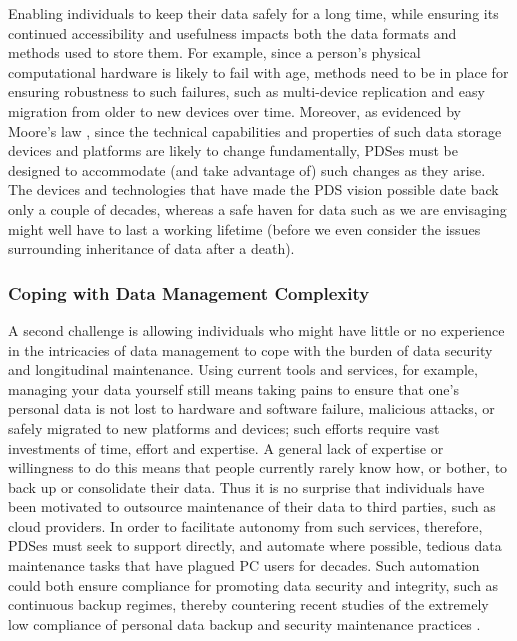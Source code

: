 \documentclass{acm_proc_article-sp}
\begin{document}
Enabling individuals to keep their data safely for a long time, while ensuring its continued accessibility and usefulness impacts both the data formats and methods used to store them.  For example, since a person's physical computational hardware is likely to fail with age, methods need to be in place for ensuring robustness to such failures, such as multi-device replication and easy migration from older to new devices over time.   Moreover, as evidenced by Moore's law \cite{schaller1997moore}, since the technical capabilities and properties of such data storage devices and platforms are likely to change fundamentally, PDSes must be designed to accommodate (and take advantage of) such changes as they arise. The devices and technologies that have made the PDS vision possible date back only a couple of decades, whereas a safe haven for data such as we are envisaging might well have to last a working lifetime (before we even consider the issues surrounding inheritance of data after a death).

\subsubsection{Coping with Data Management Complexity}

A second challenge is allowing individuals who might have little or no experience in the intricacies of data management to cope with the burden of data security and longitudinal maintenance. Using current tools and services, for example, managing your data yourself still means taking pains to ensure that one's personal data is not lost to hardware and software failure, malicious attacks, or safely migrated to new platforms and devices; such efforts require vast investments of time, effort and expertise. A general lack of expertise or willingness to do this means that people currently rarely know how, or bother, to back up or consolidate their data. Thus it is no surprise that individuals have been motivated to outsource maintenance of their data to third parties, such as cloud providers. In order to facilitate autonomy from such services, therefore, PDSes must seek to support directly, and automate where possible, tedious data maintenance tasks that have plagued PC users for decades. Such automation could both ensure compliance for promoting data security and integrity, such as continuous backup regimes, thereby countering recent studies of the extremely low compliance of personal data backup and security maintenance practices \cite{chervenak1998protecting, grasso2006survey}.
\end{document}
